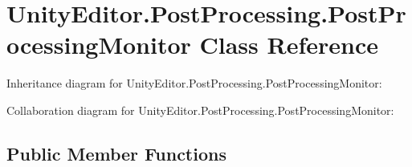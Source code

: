 \hypertarget{class_unity_editor_1_1_post_processing_1_1_post_processing_monitor}{}\section{Unity\+Editor.\+Post\+Processing.\+Post\+Processing\+Monitor Class Reference}
\label{class_unity_editor_1_1_post_processing_1_1_post_processing_monitor}


Inheritance diagram for Unity\+Editor.\+Post\+Processing.\+Post\+Processing\+Monitor\+:


Collaboration diagram for Unity\+Editor.\+Post\+Processing.\+Post\+Processing\+Monitor\+:
\subsection*{Public Member Functions}
